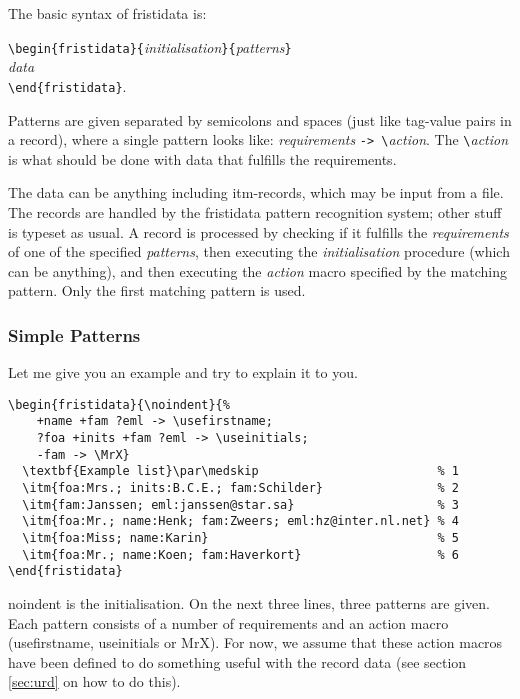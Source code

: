 \documentclass[11pt]{article}
\makeatletter
\def\macroname#1{{\ttfamily\@ttbs#1}}  %
\def\envirname#1{{\ttfamily #1}}       %
\def\={\verb=}
\def\<#1>{\macroname{#1}}
\makeatother
\begin{document}
The basic syntax of \envirname{fristidata} is:

\=\begin{fristidata}{=\textit{initialisation}\=}{=\textit{patterns}\=}=\\
\hbox{\quad}\textit{data}\\
\=\end{fristidata}=.

Patterns are given separated by semicolons and spaces (just like
tag-value pairs in a record), where a single pattern looks like:
\textit{requirements} \=-> \=\textit{action}. The \=\=\textit{action}
is what should be done with data that fulfills the requirements.

The data can be anything including \<itm>-records, which may be input from
a file. The records are handled by the \envirname{fristidata} pattern
recognition system; other stuff is typeset as usual.
A record is processed by checking if it fulfills the \textit{requirements}
of one of the specified \textit{patterns}, then executing the
\textit{initialisation} procedure (which can be anything), and then
executing the \textit{action} macro specified by the matching pattern.
Only the first matching pattern is used.

\subsubsection{Simple Patterns}

Let me give you an example and try to explain it to you.

\begin{verbatim}
\begin{fristidata}{\noindent}{%
    +name +fam ?eml -> \usefirstname;
    ?foa +inits +fam ?eml -> \useinitials;
    -fam -> \MrX}
  \textbf{Example list}\par\medskip                         % 1
  \itm{foa:Mrs.; inits:B.C.E.; fam:Schilder}                % 2
  \itm{fam:Janssen; eml:janssen@star.sa}                    % 3
  \itm{foa:Mr.; name:Henk; fam:Zweers; eml:hz@inter.nl.net} % 4
  \itm{foa:Miss; name:Karin}                                % 5
  \itm{foa:Mr.; name:Koen; fam:Haverkort}                   % 6
\end{fristidata}
\end{verbatim}

\<noindent> is the initialisation. On the next three lines, three
patterns are given. Each pattern consists of a number of requirements
and an action macro (\<usefirstname>, \<useinitials> or \<MrX>).
For now, we assume that these action macros have been defined to do
something useful with the record data (see section \ref{sec:urd}
on how to do this).
\end{document}
